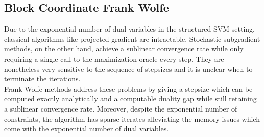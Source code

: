\subsection{Block Coordinate Frank Wolfe}
Due to the exponential number of dual variables in the structured SVM setting,
classical algorithms like projected gradient are intractable. Stochastic
subgradient methods, on the other hand, achieve a sublinear convergence rate
while only requiring a single call to the maximization oracle every step. They
are nonetheless very sensitive to the sequence of stepsizes and it is unclear
when to terminate the iterations. \\

Frank-Wolfe methods address these problems by giving a stepsize which
can be computed exactly analytically and a computable duality gap while still
retaining a sublinear convergence rate. Moreover, despite the exponential number
of constraints, the algorithm has sparse iterates alleviating the memory issues
which come with the exponential number of dual variables.

